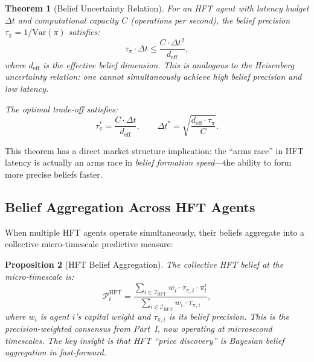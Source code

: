 \documentclass[12pt,a4paper]{article}
\newtheorem{theorem}{Theorem}[section]
\newtheorem{proposition}[theorem]{Proposition}
\theoremstyle{definition}
\newcommand{\PP}{\mathcal{P}}
\newcommand{\Var}{\mathrm{Var}}
\begin{document}
\begin{theorem}[Belief Uncertainty Relation]\label{thm:belief-uncertainty}
For an HFT agent with latency budget $\Delta t$ and computational capacity $C$ (operations per second), the belief precision $\tau_\pi = 1/\Var(\pi)$ satisfies:
\begin{equation}\label{eq:belief-uncertainty}
  \tau_\pi \cdot \Delta t \leq \frac{C \cdot \Delta t^2}{d_{\mathrm{eff}}},
\end{equation}
where $d_{\mathrm{eff}}$ is the effective belief dimension. This is analogous to the Heisenberg uncertainty relation: one cannot simultaneously achieve high belief precision and low latency.

The optimal trade-off satisfies:
\begin{equation}
  \tau_\pi^* = \frac{C \cdot \Delta t}{d_{\mathrm{eff}}}, \qquad \Delta t^* = \sqrt{\frac{d_{\mathrm{eff}} \cdot \tau_\pi}{C}}.
\end{equation}
\end{theorem}

This theorem has a direct market structure implication: the ``arms race'' in HFT latency is actually an arms race in \emph{belief formation speed}---the ability to form more precise beliefs faster.

\subsection{Belief Aggregation Across HFT Agents}

When multiple HFT agents operate simultaneously, their beliefs aggregate into a collective micro-timescale predictive measure:

\begin{proposition}[HFT Belief Aggregation]\label{prop:hft-aggregation}
The collective HFT belief at the micro-timescale is:
\begin{equation}
  \PP_t^{\mathrm{HFT}} = \frac{\sum_{i \in \mathcal{I}_{\mathrm{HFT}}} w_i \cdot \tau_{\pi,i} \cdot \pi_t^i}{\sum_{i \in \mathcal{I}_{\mathrm{HFT}}} w_i \cdot \tau_{\pi,i}},
\end{equation}
where $w_i$ is agent $i$'s capital weight and $\tau_{\pi,i}$ is its belief precision. This is the \emph{precision-weighted consensus} from Part~I, now operating at microsecond timescales. The key insight is that HFT ``price discovery'' is Bayesian belief aggregation in fast-forward.
\end{proposition}

\end{document}
